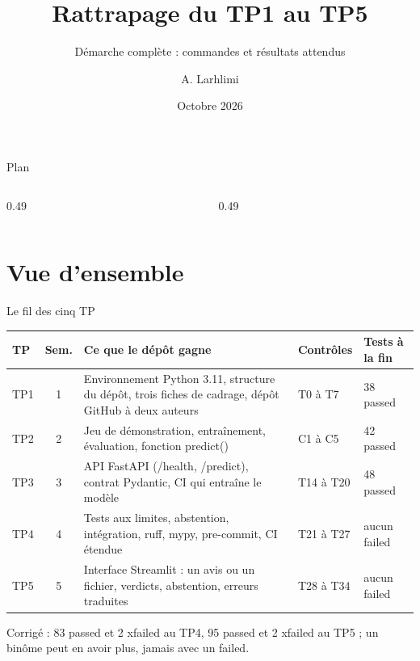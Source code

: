 \documentclass[aspectratio=169,11pt]{beamer}
\title{Rattrapage du TP1 au TP5}
\subtitle{Démarche complète : commandes et résultats attendus}
\author{A. Larhlimi}
\institute{Développement et déploiement d'applications intelligentes}
\date{Octobre 2026}
\newcommand{\co}[1]{{\ttfamily\hyphenchar\font=45\relax #1}}
\begin{document}
\maketitle

\begin{frame}{Plan}
\begin{columns}[T]
\begin{column}{0.49\textwidth}\small
\tableofcontents[sections={1-6},hideallsubsections]
\end{column}
\begin{column}{0.49\textwidth}\small
\tableofcontents[sections={7-12},hideallsubsections]
\end{column}
\end{columns}
\end{frame}

\section{Vue d'ensemble}

\begin{frame}{Le fil des cinq TP}
\scriptsize
\begin{tabularx}{\textwidth}{@{}l c X l l@{}}
\toprule
\textbf{TP} & \textbf{Sem.} & \textbf{Ce que le dépôt gagne} & \textbf{Contrôles} & \textbf{Tests à la fin} \\
\midrule
TP1 & 1 & Environnement Python 3.11, structure du dépôt, trois fiches de cadrage, dépôt GitHub à deux auteurs & T0 à T7 & 38 passed \\
TP2 & 2 & Jeu de démonstration, entraînement, évaluation, fonction \co{predict()} & C1 à C5 & 42 passed \\
TP3 & 3 & API FastAPI (\co{/health}, \co{/predict}), contrat Pydantic, CI qui entraîne le modèle & T14 à T20 & 48 passed \\
TP4 & 4 & Tests aux limites, abstention, intégration, ruff, mypy, pre-commit, CI étendue & T21 à T27 & aucun \co{failed} \\
TP5 & 5 & Interface Streamlit : un avis ou un fichier, verdicts, abstention, erreurs traduites & T28 à T34 & aucun \co{failed} \\
\bottomrule
\end{tabularx}

\medskip
Corrigé : 83 passed et 2 xfailed au TP4, 95 passed et 2 xfailed au TP5 ; un binôme peut en avoir plus, jamais avec un \co{failed}.
\end{frame}
\end{document}
